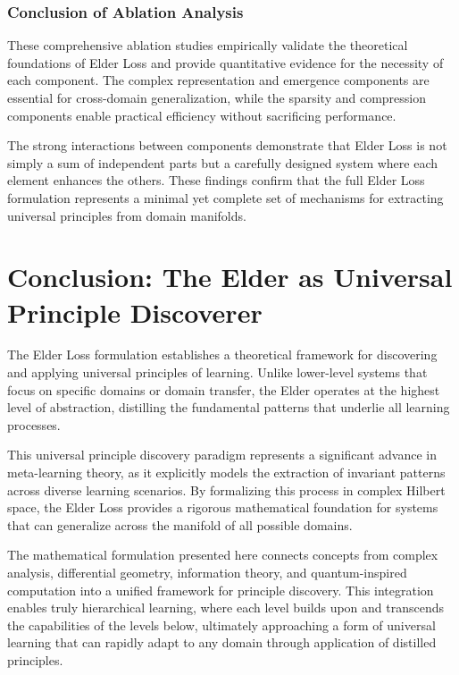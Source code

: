 \subsubsection{Conclusion of Ablation Analysis}

These comprehensive ablation studies empirically validate the theoretical foundations of Elder Loss and provide quantitative evidence for the necessity of each component. The complex representation and emergence components are essential for cross-domain generalization, while the sparsity and compression components enable practical efficiency without sacrificing performance.

The strong interactions between components demonstrate that Elder Loss is not simply a sum of independent parts but a carefully designed system where each element enhances the others. These findings confirm that the full Elder Loss formulation represents a minimal yet complete set of mechanisms for extracting universal principles from domain manifolds.

\section{Conclusion: The Elder as Universal Principle Discoverer}

The Elder Loss formulation establishes a theoretical framework for discovering and applying universal principles of learning. Unlike lower-level systems that focus on specific domains or domain transfer, the Elder operates at the highest level of abstraction, distilling the fundamental patterns that underlie all learning processes.

This universal principle discovery paradigm represents a significant advance in meta-learning theory, as it explicitly models the extraction of invariant patterns across diverse learning scenarios. By formalizing this process in complex Hilbert space, the Elder Loss provides a rigorous mathematical foundation for systems that can generalize across the manifold of all possible domains.

The mathematical formulation presented here connects concepts from complex analysis, differential geometry, information theory, and quantum-inspired computation into a unified framework for principle discovery. This integration enables truly hierarchical learning, where each level builds upon and transcends the capabilities of the levels below, ultimately approaching a form of universal learning that can rapidly adapt to any domain through application of distilled principles.